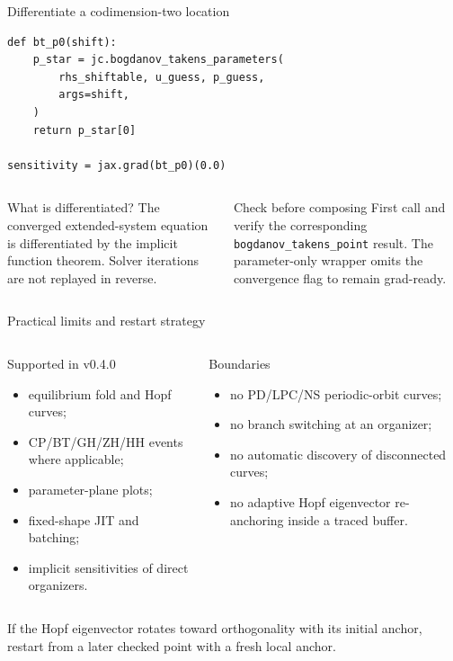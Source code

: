 \begin{frame}[fragile]{Differentiate a codimension-two location}
\small
\begin{lstlisting}
def bt_p0(shift):
    p_star = jc.bogdanov_takens_parameters(
        rhs_shiftable, u_guess, p_guess,
        args=shift,
    )
    return p_star[0]

sensitivity = jax.grad(bt_p0)(0.0)
\end{lstlisting}
\begin{columns}[T,onlytextwidth]
\begin{block}{What is differentiated?}
The converged extended-system equation is differentiated by the implicit
function theorem. Solver iterations are not replayed in reverse.
\end{block}
\begin{alertblock}{Check before composing}
First call and verify the corresponding \texttt{bogdanov\_takens\_point}
result. The parameter-only wrapper omits the convergence flag to remain
grad-ready.
\end{alertblock}
\end{columns}
\end{frame}

\begin{frame}{Practical limits and restart strategy}
\small
\begin{columns}[T,onlytextwidth]
\begin{block}{Supported in v0.4.0}
\begin{itemize}
  \item equilibrium fold and Hopf curves;
  \item CP/BT/GH/ZH/HH events where applicable;
  \item parameter-plane plots;
  \item fixed-shape JIT and batching;
  \item implicit sensitivities of direct organizers.
\end{itemize}
\end{block}
\begin{alertblock}{Boundaries}
\begin{itemize}
  \item no PD/LPC/NS periodic-orbit curves;
  \item no branch switching at an organizer;
  \item no automatic discovery of disconnected curves;
  \item no adaptive Hopf eigenvector re-anchoring inside a traced buffer.
\end{itemize}
\end{alertblock}
\end{columns}
\vspace{2mm}
If the Hopf eigenvector rotates toward orthogonality with its initial anchor,
restart from a later checked point with a fresh local anchor.
\end{frame}


